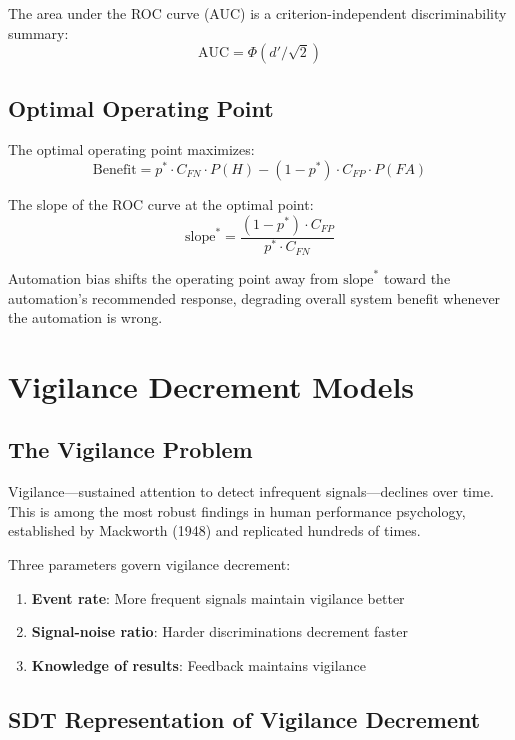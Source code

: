 The area under the ROC curve (AUC) is a criterion-independent discriminability summary:
\[
\text{AUC} = \Phi(d'/\sqrt{2})
\]

\subsection{Optimal Operating Point}

The optimal operating point maximizes:
\[
\text{Benefit} = p^* \cdot C_{FN} \cdot P(H) - (1-p^*) \cdot C_{FP} \cdot P(FA)
\]

The slope of the ROC curve at the optimal point:
\[
\text{slope}^* = \frac{(1-p^*) \cdot C_{FP}}{p^* \cdot C_{FN}}
\]

Automation bias shifts the operating point away from $\text{slope}^*$ toward the automation's recommended response, degrading overall system benefit whenever the automation is wrong.

\section{Vigilance Decrement Models}

\subsection{The Vigilance Problem}

Vigilance---sustained attention to detect infrequent signals---declines over time. This is among the most robust findings in human performance psychology, established by Mackworth (1948) and replicated hundreds of times.

Three parameters govern vigilance decrement:
\begin{enumerate}
    \item \textbf{Event rate}: More frequent signals maintain vigilance better
    \item \textbf{Signal-noise ratio}: Harder discriminations decrement faster
    \item \textbf{Knowledge of results}: Feedback maintains vigilance
\end{enumerate}

\subsection{SDT Representation of Vigilance Decrement}

